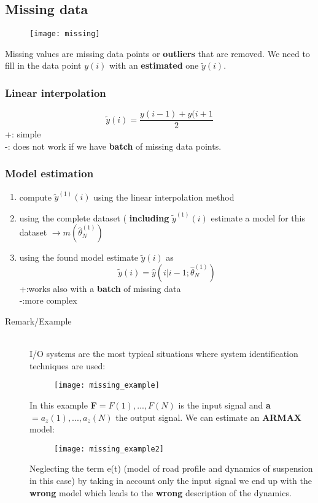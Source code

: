 \subsection{Missing data}
\begin{figure}[H]
 \centering
  \texttt{[image: missing]}
\end{figure}
Missing values are missing data points or \textbf{outliers} that are removed.
We need to fill in the data point $y(i)$ with an \textbf{estimated} one $\tilde{y}(i)$.
\subsubsection{Linear interpolation}
\[
\boxed{\tilde{y}(i) = \frac{y(i-1)+y(i+1}{2}}
\]
+: simple\\
-: does not work if we have \textbf{batch} of missing data points.

\subsubsection{Model estimation}
\begin{enumerate}
\item compute $\tilde{y}^{(1)}(i)$ using the linear interpolation method
\item using the complete dataset ( \textbf{including} $\tilde{y}^{(1)}(i)$ estimate a model for this dataset $\to m(\hat{\theta}^{(1)}_N)$
\item using the found model estimate $\tilde{y}(i)$ as 
\[
\boxed{\tilde{y}(i) = \hat{y}(i|i-1;\hat{\theta}^{(1)}_N)}
\] 
+:works also with a \textbf{batch} of missing data\\
-:more complex
\end{enumerate}
\newpage
\begin{description}
\item [Remark/Example]\hfill\\
I/O systems are the most typical situations where system identification techniques are used:
\begin{figure}[H]
 \centering
  \texttt{[image: missing\_example]}
\end{figure}
In this example \textbf{F}$={F(1),...,F(N)}$ is the input signal and \textbf{a}$={a_z(1),...,a_z(N)}$ the output signal. We can estimate an \textbf{ARMAX} model:
\begin{figure}[H]
 \centering
  \texttt{[image: missing\_example2]}
\end{figure}
Neglecting the term e(t) (model of road profile and dynamics of suspension in this case) by taking in account only the input signal we end up with the \textbf{wrong} model which leads to the \textbf{wrong} description of the dynamics.
\end{description}
